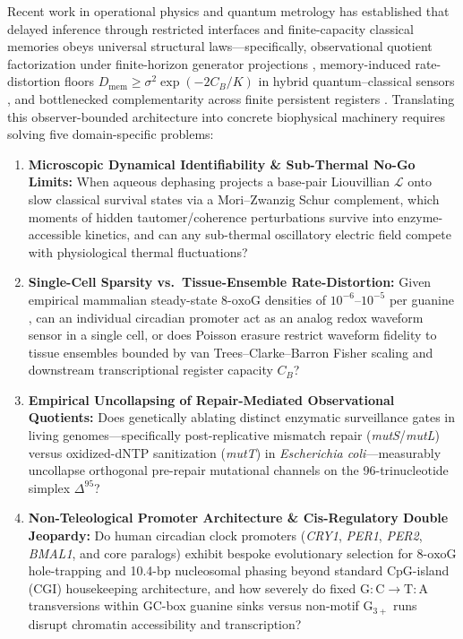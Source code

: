 \documentclass[10pt,letterpaper]{article}
\theoremstyle{plain}
\theoremstyle{definition}
\newcommand{\Lcal}{\mathcal{L}}
\newcommand{\oxog}{\text{8-oxoG}}
\begin{document}
Recent work in operational physics and quantum metrology has established that delayed inference through restricted interfaces and finite-capacity classical memories obeys universal structural laws---specifically, observational quotient factorization under finite-horizon generator projections \cite{garcia2026observer}, memory-induced rate-distortion floors $D_{\mathrm{mem}} \ge \sigma^2 \exp(-2C_B/K)$ in hybrid quantum--classical sensors \cite{garcia2026memory}, and bottlenecked complementarity across finite persistent registers \cite{berta2009uncertainty,garcia2026quantumlike,pollock2018pra,milz2018pra}. Translating this observer-bounded architecture into concrete biophysical machinery requires solving five domain-specific problems:
\begin{enumerate}[leftmargin=1.8em,itemsep=2pt]
    \item \textbf{Microscopic Dynamical Identifiability \& Sub-Thermal No-Go Limits:} When aqueous dephasing projects a base-pair Liouvillian $\Lcal$ onto slow classical survival states via a Mori--Zwanzig Schur complement, which moments of hidden tautomer/coherence perturbations survive into enzyme-accessible kinetics, and can any sub-thermal oscillatory electric field compete with physiological thermal fluctuations?
    \item \textbf{Single-Cell Sparsity vs.\ Tissue-Ensemble Rate-Distortion:} Given empirical mammalian steady-state $\oxog$ densities of $10^{-6}$--$10^{-5}$ per guanine \cite{wang2025jbiomedsci,obermann2024redox,li2025nar}, can an individual circadian promoter act as an analog redox waveform sensor in a single cell, or does Poisson erasure restrict waveform fidelity to tissue ensembles bounded by van Trees--Clarke--Barron Fisher scaling and downstream transcriptional register capacity $C_B$?
    \item \textbf{Empirical Uncollapsing of Repair-Mediated Observational Quotients:} Does genetically ablating distinct enzymatic surveillance gates in living genomes---specifically post-replicative mismatch repair (\emph{mutS}/\emph{mutL}) versus oxidized-dNTP sanitization (\emph{mutT}) in \emph{Escherichia coli}---measurably uncollapse orthogonal pre-repair mutational channels on the 96-trinucleotide simplex $\Delta^{95}$?
    \item \textbf{Non-Teleological Promoter Architecture \& Cis-Regulatory Double Jeopardy:} Do human circadian clock promoters (\emph{CRY1}, \emph{PER1}, \emph{PER2}, \emph{BMAL1}, and core paralogs) exhibit bespoke evolutionary selection for $\oxog$ hole-trapping and 10.4-bp nucleosomal phasing beyond standard CpG-island (CGI) housekeeping architecture, and how severely do fixed $\mathrm{G{:}C \to T{:}A}$ transversions within GC-box guanine sinks versus non-motif $\mathrm{G}_{3+}$ runs disrupt chromatin accessibility and transcription?

\end{enumerate}
\end{document}
